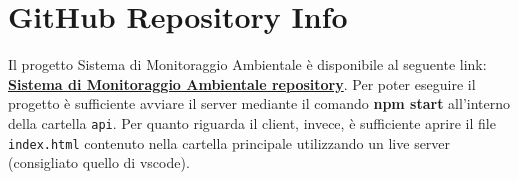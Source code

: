\chapter{GitHub Repository Info}

Il progetto Sistema di Monitoraggio Ambientale è disponibile al seguente link: \textbf{\textcolor{black}{\href{https://github.com/luiss07/SistemaMonitoraggioAmbientale}{Sistema di Monitoraggio Ambientale repository}}}. Per poter eseguire il progetto è sufficiente avviare il server mediante il comando \textbf{npm start} all'interno della cartella \texttt{api}. Per quanto riguarda il client, invece, è sufficiente aprire il file \texttt{index.html} contenuto nella cartella principale utilizzando un live server (consigliato quello di vscode).